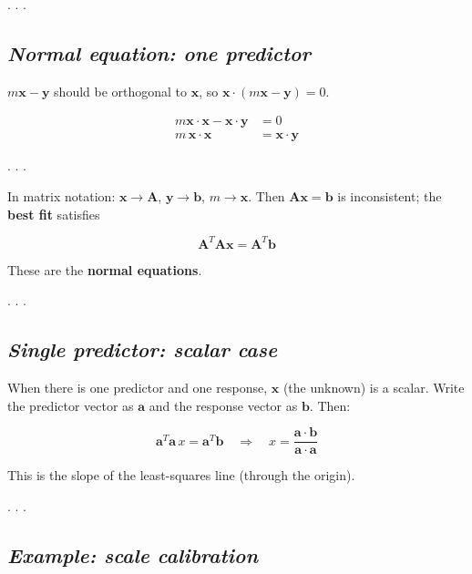 \documentclass[
  letterpaper,
  DIV=11,
  numbers=noendperiod]{scrartcl}
\begin{document}
. . .

\subsection{\texorpdfstring{\emph{Normal equation: one
predictor}}{Normal equation: one predictor}}\label{normal-equation-one-predictor}

\(m \mathbf{x} - \mathbf{y}\) should be orthogonal to \(\mathbf{x}\), so
\(\mathbf{x} \cdot (m \mathbf{x} - \mathbf{y}) = 0\).

\[
\begin{aligned}
m \mathbf{x} \cdot \mathbf{x} - \mathbf{x} \cdot \mathbf{y} &= 0 \\
m \,\mathbf{x} \cdot \mathbf{x} &= \mathbf{x} \cdot \mathbf{y}
\end{aligned}
\]

. . .

In matrix notation: \(\mathbf{x} \to \mathbf{A}\),
\(\mathbf{y} \to \mathbf{b}\), \(m \to \mathbf{x}\). Then
\(\mathbf{A} \mathbf{x} = \mathbf{b}\) is inconsistent; the \textbf{best
fit} satisfies

\[
\mathbf{A}^T \mathbf{A} \mathbf{x} = \mathbf{A}^T \mathbf{b}
\]

These are the \textbf{normal equations}.

. . .

\subsection{\texorpdfstring{\emph{Single predictor: scalar
case}}{Single predictor: scalar case}}\label{single-predictor-scalar-case}

When there is one predictor and one response, \(\mathbf{x}\) (the
unknown) is a scalar. Write the predictor vector as \(\mathbf{a}\) and
the response vector as \(\mathbf{b}\). Then:

\[
\mathbf{a}^T \mathbf{a}\, x = \mathbf{a}^T \mathbf{b}
\quad \Rightarrow \quad
x = \frac{\mathbf{a} \cdot \mathbf{b}}{\mathbf{a} \cdot \mathbf{a}}
\]

This is the slope of the least-squares line (through the origin).

. . .

\subsection{\texorpdfstring{\emph{Example: scale
calibration}}{Example: scale calibration}}\label{example-scale-calibration}
\end{document}
